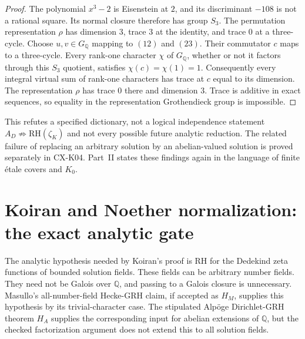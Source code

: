 \documentclass[11pt,a4paper]{article}
\begin{document}
\begin{proof}
The polynomial $x^3-2$ is Eisenstein at $2$, and its discriminant $-108$ is
not a rational square.  Its normal closure therefore has group $S_3$.
The permutation representation $\rho$ has dimension $3$, trace $3$ at the
identity, and trace $0$ at a three-cycle.  Choose $u,v\in G_{\mathbb Q}$
mapping to $(12)$ and $(23)$.  Their commutator $c$ maps to a three-cycle.
Every rank-one character $\chi$ of $G_{\mathbb Q}$, whether or not it
factors through this $S_3$ quotient, satisfies $\chi(c)=\chi(1)=1$.
Consequently every integral virtual sum of rank-one characters has trace
at $c$ equal to its dimension.  The representation $\rho$ has trace $0$
there and dimension $3$.  Trace is additive in exact sequences, so equality
in the representation Grothendieck group is impossible.
\end{proof}

This refutes a specified dictionary, not a logical independence statement
$A_D\nRightarrow\mathrm{RH}(\zeta_K)$ and not every possible future analytic
reduction.  The related failure of replacing an arbitrary solution by an
abelian-valued solution is proved separately in CX-K04.  Part~II states
these findings again in the language of finite étale covers and $K_0$.




\section{Koiran and Noether normalization: the exact analytic gate}

The analytic hypothesis needed by Koiran's proof is RH for the Dedekind
zeta functions of bounded solution fields. These fields can be arbitrary
number fields. They need not be Galois over $\mathbb Q$, and passing to a
Galois closure is unnecessary. Masullo's all-number-field Hecke-GRH claim,
if accepted as $H_M$, supplies this hypothesis by its trivial-character
case. The stipulated Alp\"oge Dirichlet-GRH theorem $H_A$ supplies the
corresponding input for abelian extensions of $\mathbb Q$, but the checked
factorization argument does not extend this to all solution fields.
\end{document}
